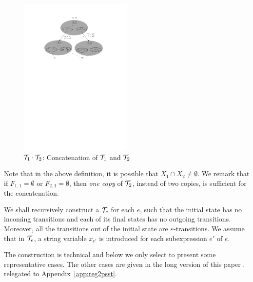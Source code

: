 \begin{definition}
\begin{figure}[tb]
			\centering
			\includegraphics[width = 0.5\textwidth]{psstconcat.pdf}
			\caption{$\mathcal{T}_1\cdot \mathcal{T}_2$: Concatenation of $\mathcal{T}_1$ and $\mathcal{T}_2$}
			\label{fig-psstconcat}
		\end{figure}  
\end{definition}
Note that in the above definition, it is possible that $X_1 \cap X_2 \neq \emptyset$. We remark that if $F_{1,1} = \emptyset$ or $F_{2,1} = \emptyset$, then \emph{one copy} of $\mathcal{T}_2$, instead of two copies, is sufficient for the concatenation.

We shall recursively construct a {\PSST} $\mathcal{T}_e$ for each {\pcre} $e$, such that the initial state has no incoming transitions and each of its final states has no outgoing transitions. Moreover, all the transitions out of the initial state are $\varepsilon$-transitions. 
%
We assume that in $\mathcal{T}_e$, a string variable $x_{e'}$ is introduced for each subexpression $e'$ of $e$. 

The construction is technical and below we only select to present some representative cases. The other cases are
%
\ifproceeding given in the long version of this paper \cite{popl22-full}. 
\else relegated to Appendix~\ref{app:reg2psst}. 
\fi

